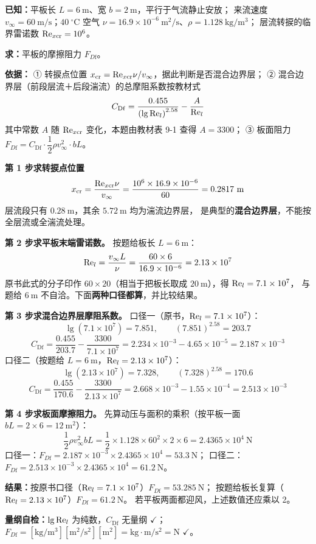 \begin{jie}
\textbf{已知：}平板长 $L=6\ \mathrm{m}$、宽 $b=2\ \mathrm{m}$，平行于气流静止安放；
来流速度 $v_\infty=60\ \mathrm{m/s}$；$40\ ^{\circ}\mathrm{C}$ 空气
$\nu=16.9\times10^{-6}\ \mathrm{m^2/s}$、$\rho=1.128\ \mathrm{kg/m^3}$；
层流转捩的临界雷诺数 $\mathrm{Re}_{x\mathrm{cr}}=10^{6}$。

\textbf{求：}平板的摩擦阻力 $F_{D\mathrm{f}}$。

\textbf{依据：}
① 转捩点位置 $x_{\mathrm{cr}}=\mathrm{Re}_{x\mathrm{cr}}\nu/v_\infty$，据此判断是否混合边界层；
② 混合边界层（前段层流＋后段湍流）的总摩阻系数按教材式
\[ C_{\mathrm{Df}}=\frac{0.455}{\left(\lg \mathrm{Re}_l\right)^{2.58}}-\frac{A}{\mathrm{Re}_l} \]
其中常数 $A$ 随 $\mathrm{Re}_{x\mathrm{cr}}$ 变化，本题由教材表 9-1 查得 $A=3300$；
③ 板面阻力 $F_{D\mathrm{f}}=C_{\mathrm{Df}}\cdot\dfrac{1}{2}\rho v_\infty^{2}\cdot bL$。

\textbf{第 1 步\quad 求转捩点位置}
\[ x_{\mathrm{cr}}=\frac{\mathrm{Re}_{x\mathrm{cr}}\nu}{v_\infty}
=\frac{10^{6}\times16.9\times10^{-6}}{60}=0.2817\ \mathrm{m} \]
层流段只有 $0.28\ \mathrm{m}$，其余 $5.72\ \mathrm{m}$ 均为湍流边界层，
是典型的\textbf{混合边界层}，不能按全层流或全湍流处理。

\textbf{第 2 步\quad 求平板末端雷诺数。}
按题给板长 $L=6\ \mathrm{m}$：
\[ \mathrm{Re}_l=\frac{v_\infty L}{\nu}=\frac{60\times6}{16.9\times10^{-6}}=2.13\times10^{7} \]
原书此式的分子印作 $60\times20$（相当于把板长取成 $20\ \mathrm{m}$），得 $\mathrm{Re}_l=7.1\times10^{7}$，
与题给 $6\ \mathrm{m}$ 不自洽。下面\textbf{两种口径都算}，并比较结果。

\textbf{第 3 步\quad 求混合边界层摩阻系数。}
口径一（原书，$\mathrm{Re}_l=7.1\times10^{7}$）：
\[ \lg\left(7.1\times10^{7}\right)=7.851,\qquad (7.851)^{2.58}=203.7 \]
\[ C_{\mathrm{Df}}=\frac{0.455}{203.7}-\frac{3300}{7.1\times10^{7}}
=2.234\times10^{-3}-4.65\times10^{-5}=2.187\times10^{-3} \]
口径二（按题给 $L=6\ \mathrm{m}$，$\mathrm{Re}_l=2.13\times10^{7}$）：
\[ \lg\left(2.13\times10^{7}\right)=7.328,\qquad (7.328)^{2.58}=170.6 \]
\[ C_{\mathrm{Df}}=\frac{0.455}{170.6}-\frac{3300}{2.13\times10^{7}}
=2.668\times10^{-3}-1.55\times10^{-4}=2.513\times10^{-3} \]

\textbf{第 4 步\quad 求板面摩擦阻力。}
先算动压与面积的乘积（按平板一面 $bL=2\times6=12\ \mathrm{m^2}$）：
\[ \frac{1}{2}\rho v_\infty^{2}bL=\frac{1}{2}\times1.128\times60^{2}\times2\times6=2.4365\times10^{4}\ \mathrm{N} \]
口径一：$F_{D\mathrm{f}}=2.187\times10^{-3}\times2.4365\times10^{4}=53.3\ \mathrm{N}$；
口径二：$F_{D\mathrm{f}}=2.513\times10^{-3}\times2.4365\times10^{4}=61.2\ \mathrm{N}$。

\textbf{结果：}按原书口径（$\mathrm{Re}_l=7.1\times10^{7}$）$F_{D\mathrm{f}}=53.285\ \mathrm{N}$；
按题给板长复算（$\mathrm{Re}_l=2.13\times10^{7}$）$F_{D\mathrm{f}}=61.2\ \mathrm{N}$。
若平板两面都迎风，上述数值还应乘以 2。

\textbf{量纲自检：}$\lg \mathrm{Re}_l$ 为纯数，$C_{\mathrm{Df}}$ 无量纲 $\checkmark$；
$F_{D\mathrm{f}}=[\mathrm{kg/m^3}][\mathrm{m^2/s^2}][\mathrm{m^2}]=\mathrm{kg\cdot m/s^2}=\mathrm{N}$ $\checkmark$。
\end{jie}

